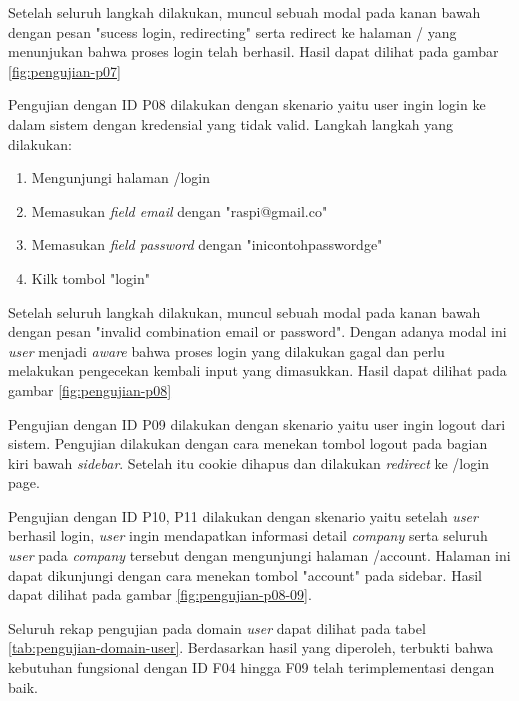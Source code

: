 Setelah seluruh langkah dilakukan, muncul sebuah modal pada kanan bawah dengan pesan "sucess login, redirecting" serta redirect ke halaman / yang menunjukan bahwa proses login telah berhasil. Hasil dapat dilihat pada gambar \ref{fig:pengujian-p07}

Pengujian dengan ID P08 dilakukan dengan skenario yaitu user ingin login ke dalam sistem dengan kredensial yang tidak valid. Langkah langkah yang dilakukan:

\begin{enumerate}
  \item Mengunjungi halaman /login
  \item Memasukan \textit{field email} dengan "raspi@gmail.co"
  \item Memasukan \textit{field password} dengan "inicontohpasswordge"
  \item Kilk tombol "login"
\end{enumerate}

Setelah seluruh langkah dilakukan, muncul sebuah modal pada kanan bawah dengan pesan "invalid combination email or password". Dengan adanya modal ini \textit{user} menjadi \textit{aware} bahwa proses login yang dilakukan gagal dan perlu melakukan pengecekan kembali input yang dimasukkan. Hasil dapat dilihat pada gambar \ref{fig:pengujian-p08}

Pengujian dengan ID P09 dilakukan dengan skenario yaitu user ingin logout dari sistem. Pengujian dilakukan dengan cara menekan tombol logout pada bagian kiri bawah \textit{sidebar}. Setelah itu cookie dihapus dan dilakukan \textit{redirect} ke /login page.

Pengujian dengan ID P10, P11 dilakukan dengan skenario yaitu setelah \textit{user} berhasil login, \textit{user} ingin mendapatkan informasi detail \textit{company} serta seluruh \textit{user} pada \textit{company} tersebut dengan mengunjungi halaman /account. Halaman ini dapat dikunjungi dengan cara menekan tombol "account" pada sidebar. Hasil dapat dilihat pada gambar \ref{fig:pengujian-p08-09}.

Seluruh rekap pengujian pada domain \textit{user} dapat dilihat pada tabel \ref{tab:pengujian-domain-user}. Berdasarkan hasil yang diperoleh, terbukti bahwa kebutuhan fungsional dengan ID F04 hingga F09 telah terimplementasi dengan baik.

